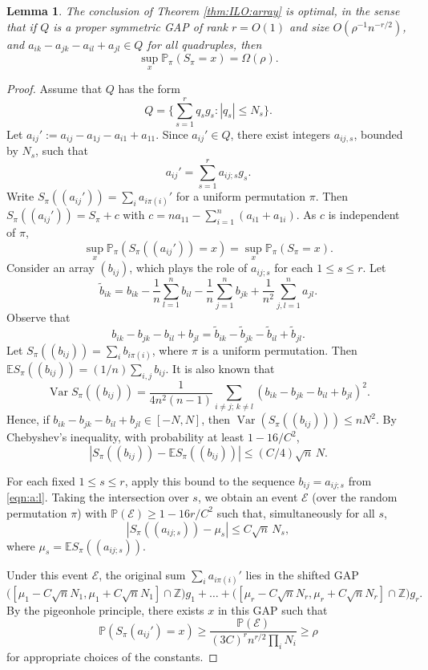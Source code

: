 \documentclass[reqno]{amsart}
\newcommand\Z{{\mathbb{Z}}}
\renewcommand\P{{\mathbb{P}}}
\newcommand\E{{\mathbb{E}}}
\newcommand\Var{\operatorname{Var}}
\newcommand\CE{{\mathcal E}}
\theoremstyle{plain}
\newtheorem{lemma}[theorem]{Lemma}
\theoremstyle{definition}
\begin{document}
\begin{lemma}\label{lemma:optimal} The conclusion of Theorem \ref{thm:ILO:array} is optimal, in the sense that 
if $Q$ is a {proper symmetric GAP} of rank $r=O(1)$ and size $O(\rho^{-1}n^{-r/2})$, and $a_{i k} - a_{j k} - a_{i l} + a_{j l} \in Q$ for all quadruples, then 
\[
\sup_{x} \P_\pi (S_{\pi}=x) =\Omega(\rho).
\]
\end{lemma}
\begin{proof} Assume that $Q$ has the form
\[
Q = \{\sum_{s=1}^{r} q_{s} g_{s}: |q_{s}| \le N_{s} \}.
\]
Let $a_{ij}' := a_{ij}-a_{1j}-a_{i1} + a_{11}$. Since $a_{ij}'\in Q$, there exist integers $a_{ij,s}$, bounded by $N_s$, such that
\begin{equation}\label{eqn:a:l}
a_{ij}' = \sum_{s=1}^{r} a_{ij;s} g_{s}.
\end{equation}
Write $S_{\pi}((a_{ij}'))= \sum_i a_{i \pi(i)}'$ for a uniform permutation $\pi$. Then $S_{\pi}((a_{ij}'))=S_{\pi}+c$ with $c=na_{11}-\sum_{i=1}^n(a_{i1}+a_{1i})$. As $c$ is independent of $\pi$,  
\[
\sup_{x} \P_\pi (S_{\pi}((a_{ij}'))=x) =\sup_{x} \P_\pi (S_{\pi}=x).
\]
Consider an array $(b_{ij})$, which plays the role of $a_{ij;s}$ for each $1\le s\le r$. Let
$$\tilde b_{ik} =  b_{ik} - \frac{1}{n} \sum_{l=1}^{n} b_{il} - \frac{1}{n} \sum_{j=1}^{n} b_{jk}  + \frac{1}{n^{2}}\sum_{j,l=1}^na_{jl}.$$
Observe that 
\[
b_{ik}-b_{jk} - b_{il}+b_{jl} = \tilde b_{ik}- \tilde b_{jk} - \tilde b_{il}+ \tilde b_{jl}.
\]
Let $S_{\pi}((b_{ij}))=\sum_i b_{i\pi(i)}$, where $\pi$ is a uniform permutation. Then
$\E S_{\pi}((b_{ij}))=(1/n)\sum_{i,j} b_{ij}$. It is also known \cite[formula (89)]{Gold} that
\begin{equation}\label{eqn:Var}
\Var S_{\pi}((b_{ij}))=\frac{1}{4n^2(n-1)}\sum_{i\ne j;\,k\ne l}
(b_{ik}-b_{jk}-b_{il}+b_{jl})^2.
\end{equation}
Hence, if $b_{ik}-b_{jk}-b_{il}+b_{jl}\in[-N,N]$, then
$\Var(S_{\pi}((b_{ij})))\le nN^2$. By Chebyshev's inequality, with probability at least
$1-16/C^2$,
\begin{equation}\label{eqn:Chebyl}
|S_{\pi}((b_{ij}))-\E S_{\pi}((b_{ij}))|\le (C/4)\sqrt{n}\,N .
\end{equation}

For each fixed $1\le s\le r$, apply this bound to the sequence
$b_{ij}=a_{ij;s}$ from \eqref{eqn:a:l}. Taking the intersection over $s$,
we obtain an event $\CE$ (over the random permutation $\pi$) with
$\P(\CE)\ge 1-16r/C^2$ such that, simultaneously for all $s$,
\[
|S_{\pi}((a_{ij;s}))-\mu_s|\le C\sqrt{n}\,N_s,
\]
where $\mu_s=\E S_{\pi}((a_{ij;s}))$.

Under this event $\CE$, the original sum $\sum_i a_{i\pi(i)}'$ lies in the shifted GAP
\[
\big([\mu_1-C\sqrt{n}N_1,\mu_1+C\sqrt{n}N_1]\cap\Z\big)g_1
+\dots+\big([\mu_r-C\sqrt{n}N_r,\mu_r+C\sqrt{n}N_r]\cap\Z\big)g_r.
\]
By the pigeonhole principle, there exists $x$ in this GAP such that
\[
\P(S_{\pi}(a_{ij}')=x)
\ge
\frac{\P(\CE)}{(3C)^r n^{r/2}\prod_i N_i}
\ge
\rho
\]
for appropriate choices of the constants.
\end{proof}
\end{document}
